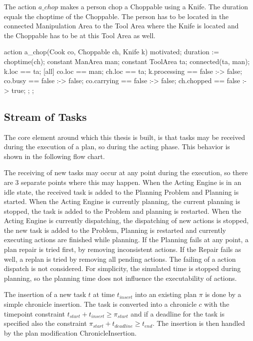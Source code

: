 The action $a\_chop$ makes a person chop a Choppable using a Knife.
The duration equals the choptime of the Choppable.
The person has to be located in the connected Manipulation Area to the Tool Area where the Knife is located and the Choppable has to be at this Tool Area as well.

\begin{anmlcode}
action a_chop(Cook co, Choppable ch, Knife k) {
  motivated;
  duration := choptime(ch);
  constant ManArea man;
  constant ToolArea ta;
  connected(ta, man);
  k.loc == ta;
  [all] {
    co.loc == man;
    ch.loc == ta;
    k.processing == false :-> false;
    co.busy == false :-> false;
    co.carrying == false :-> false;
    ch.chopped == false :-> true;
  };
};
\end{anmlcode}


\subsection{Stream of Tasks}

The core element around which this thesis is built, is that tasks may be received during the execution of a plan, so during the acting phase.
This behavior is shown in the following flow chart.


The receiving of new tasks may occur at any point during the execution, so there are 3 separate points where this may happen.
When the Acting Engine is in an idle state, the received task is added to the Planning Problem and Planning is started.
When the Acting Engine is currently planning, the current planning is stopped, the task is added to the Problem and planning is restarted.
When the Acting Engine is currently dispatching, the dispatching of new actions is stopped, the new task is added to the Problem, Planning is restarted and currently executing actions are finished while planning.
If the Planning fails at any point, a plan repair is tried first, by removing inconsistent actions.
If the Repair fails as well, a replan is tried by removing all pending actions.
The failing of a action dispatch is not considered.
For simplicity, the simulated time is stopped during planning, so the planning time does not influence the executability of actions.

The insertion of a new task $t$ at time $t_{insert}$ into an existing plan $\pi$ is done by a simple chronicle insertion.
The task is converted into a chronicle $c$ with the timepoint constraint $t_{start} + t_{insert} \geq \pi_{start}$ and if a deadline for the task is specified also the constraint $\pi_{start} + t_{deadline} \geq t_{end}$.
The insertion is then handled by the plan modification ChronicleInsertion.

